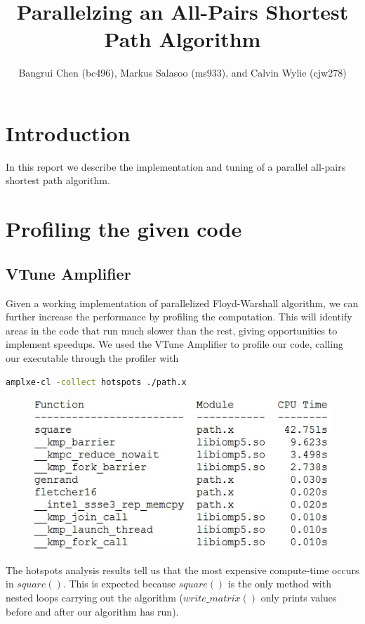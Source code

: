 \documentclass[11pt]{article}
\title{Parallelzing an All-Pairs Shortest Path Algorithm}
\author{Bangrui Chen (bc496), Markus Salasoo (ms933), and Calvin Wylie (cjw278)}
\begin{document}
\maketitle

\section*{Introduction}

In this report we describe the implementation and tuning of a parallel all-pairs shortest
path algorithm.

\section*{Profiling the given code}

\subsection*{VTune Amplifier}
Given a working implementation of parallelized Floyd-Warshall algorithm, we can further increase the performance by profiling the computation. This will identify areas in the code that run much slower than the rest, giving opportunities to implement speedups. We used the VTune Amplifier to profile our code, calling our executable through the profiler with
\begin{lstlisting}[language=bash]
amplxe-cl -collect hotspots ./path.x
\end{lstlisting}
\begin{figure}[ht!]
\centering
\includegraphics{vtuneResults.jpg}
\end{figure}
The hotspots analysis results tell us that the most expensive compute-time occurs in $square()$. This is expected because $square()$ is the only method with nested loops carrying out the algorithm ($write\_matrix()$ only prints values before and after our algorithm has run).\newline\newline
\end{document}
